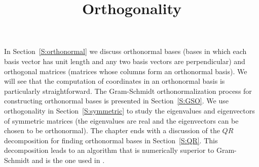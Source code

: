 \documentclass{ximera}
\title{Orthogonality}
\begin{document}
\begin{abstract}
\end{abstract}
\maketitle

\normalsize


In Section~\ref{S:orthonormal} we discuss orthonormal bases (bases in
which each basis vector has unit length and any two basis vectors are 
perpendicular) and orthogonal matrices (matrices whose columns form an orthonormal basis).
We will see that the computation of coordinates in an orthonormal basis is
particularly straightforward.  
The  Gram-Schmidt
orthonormalization process for constructing orthonormal bases is presented in 
Section~\ref{S:GSO}.  We
use orthogonality in Section~\ref{S:symmetric} to study
the eigenvalues and eigenvectors of symmetric matrices (the eigenvalues are
real and the eigenvectors can be chosen to be orthonormal).   The chapter ends with a discussion of the $QR$
decomposition for finding orthonormal bases in Section~\ref{S:QR}.  This
decomposition leads to an algorithm that is numerically superior to
Gram-Schmidt and is the one used in \Matlabp.
\end{document}
